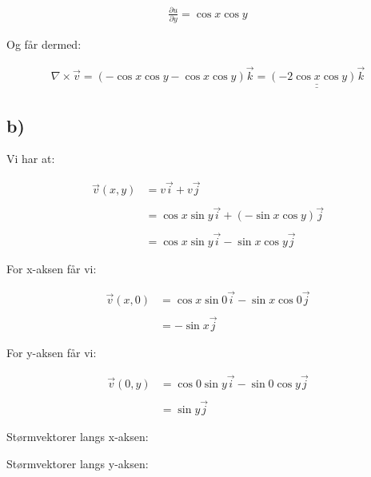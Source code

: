 \documentclass{article}
\newcommand{\answer}[1]{\underline{\underline{#1}}}
\begin{document}
\begin{flushle}
\begin{multicols}{2}
\begin{align*}
\frac{\partial u}{\partial y} = \cos{x}\cos{y}
\end{align*}
\end{multicols}

\bigskip

\begin{flushleft}
Og får dermed:
\end{flushleft}
\begin{align*}
\nabla \times \vec{v} = (-\cos{x}\cos{y} - \cos{x}\cos{y})\vec{k} = \answer{(-2\cos{x}\cos{y})\vec{k}}
\end{align*}

%
%

\subsection*{b)}

\begin{flushleft}
Vi har at:
\end{flushleft}
\begin{align*}
\vec{v}(x, y) & = v\vec{i} + v\vec{j} \\ \\
 & = \cos{x}\sin{y}\vec{i} + (-\sin{x}\cos{y})\vec{j} \\ \\
 & = \cos{x}\sin{y}\vec{i} - \sin{x}\cos{y}\vec{j}
\end{align*}
\begin{flushleft}
For x-aksen får vi:
\end{flushleft}
\begin{align*}
\vec{v}(x, 0) & = \cos{x}\sin{0}\vec{i} - \sin{x}\cos{0}\vec{j} \\ \\
 & = -\sin{x}\vec{j}
\end{align*}

\begin{flushleft}
For y-aksen får vi:
\end{flushleft}
\begin{align*}
\vec{v}(0, y) & = \cos{0}\sin{y}\vec{i} - \sin{0}\cos{y}\vec{j} \\ \\
 & = \sin{y}\vec{j}
\end{align*}

\bigskip

\begin{multicols}{2}
\begin{flushleft}
Størmvektorer langs x-aksen:
\end{flushleft}
\begin{flushleft}
Størmvektorer langs y-aksen:
\end{flushleft}
\end{multicols}


\end{flushle}
\end{document}
